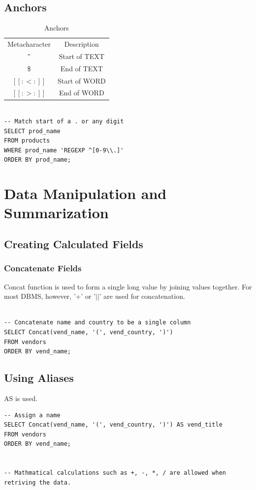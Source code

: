 \documentclass[12pt,oneside,a4paper]{article}
\begin{document}
\subsection{Anchors}

\begin{table}[h]
	\centering
	\begin{tabular}{ |c|c|} 
		\hline
		Metacharacter & Description\\ 
		$\verb|^|$ & Start of TEXT \\ 
		 \$& End of TEXT\\ 
		$[[:<:]]$ & Start of WORD\\ 
		$[[:>:]]$ & End of WORD \\ 
		\hline
	\end{tabular}
	\caption{Anchors}
\end{table}


\begin{lstlisting}

-- Match start of a . or any digit
SELECT prod_name 
FROM products 
WHERE prod_name 'REGEXP ^[0-9\\.]'
ORDER BY prod_name;
\end{lstlisting}


\section{Data Manipulation and Summarization}

\subsection{Creating Calculated Fields}

\subsubsection{Concatenate Fields} 
\textsf{Concat} function is used to form a single long value by joining values together. For most DBMS, however, '+' or '$||$' are used for concatenation.
\begin{lstlisting}

-- Concatenate name and country to be a single column
SELECT Concat(vend_name, '(', vend_country, ')')
FROM vendors
ORDER BY vend_name;
\end{lstlisting}

\subsection{Using Aliases}
\textsf{AS} is used. 
\begin{lstlisting}
-- Assign a name 
SELECT Concat(vend_name, '(', vend_country, ')') AS vend_title
FROM vendors
ORDER BY vend_name;


-- Mathmatical calculations such as +, -, *, / are allowed when retriving the data.
\end{lstlisting}
\end{document}

